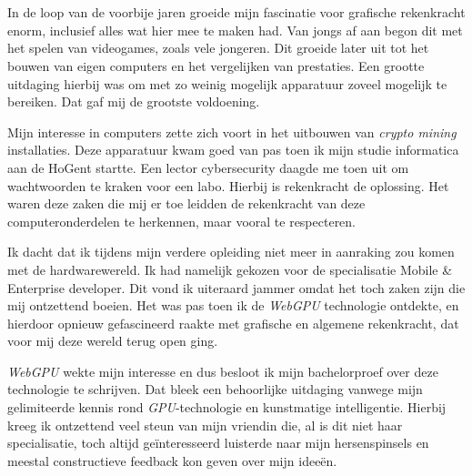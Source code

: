 
\chapter*{}%
\label{ch:voorwoord}


In de loop van de voorbije jaren groeide mijn fascinatie voor grafische rekenkracht enorm, inclusief alles wat hier mee te maken had. Van jongs af aan begon dit met het spelen van videogames, zoals vele jongeren. Dit groeide later uit tot het bouwen van eigen computers en het vergelijken van prestaties. Een grootte uitdaging hierbij was om met zo weinig mogelijk apparatuur zoveel mogelijk te bereiken. Dat gaf mij de grootste voldoening.

\bigbreak{}

Mijn interesse in computers zette zich voort in het uitbouwen van \textit{crypto mining} installaties. Deze apparatuur kwam goed van pas toen ik mijn studie informatica aan de HoGent startte. Een lector cybersecurity daagde me toen uit om wachtwoorden te kraken voor een labo. Hierbij is rekenkracht de oplossing. Het waren deze zaken die mij er toe leidden de rekenkracht van deze com\-pu\-ter\-on\-der\-de\-len te herkennen, maar vooral te respecteren. 

\bigbreak{}

Ik dacht dat ik tijdens mijn verdere opleiding niet meer in aanraking zou komen met de hardwarewereld. Ik had namelijk gekozen voor de specialisatie Mobile \& Enterprise developer. Dit vond ik uiteraard jammer omdat het toch zaken zijn die mij ontzettend boeien. Het was pas toen ik de \textit{WebGPU} technologie ontdekte, en hierdoor opnieuw gefascineerd raakte met grafische en algemene rekenkracht, dat voor mij deze wereld terug open ging.

\bigbreak{}

\textit{WebGPU} wekte mijn interesse en dus besloot ik mijn bachelorproef over deze technologie te schrijven. Dat bleek een behoorlijke uitdaging vanwege mijn gelimiteerde kennis rond \textit{GPU}-technologie en kunstmatige intelligentie. Hierbij kreeg ik ontzettend veel steun van mijn vriendin die, al is dit niet haar specialisatie, toch altijd geïnteresseerd luisterde naar mijn hersenspinsels en meestal constructieve feedback kon geven over mijn ideeën.

